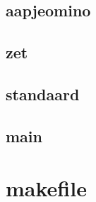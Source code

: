 \documentclass{article}
\begin{document}
\subsection{aapjeomino}

\subsection{zet}

\subsection{standaard}

\subsection{main}

\section{makefile}

\end{document}
